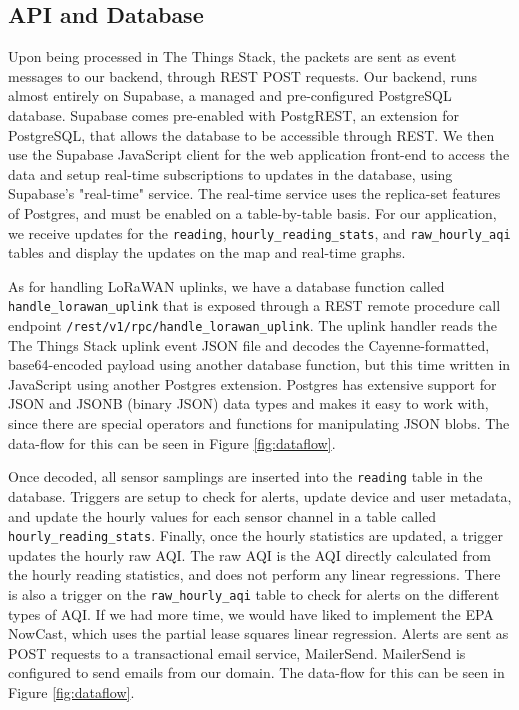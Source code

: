 \documentclass[conference]{IEEEtran}
\newcommand*{\lorawan}{LoRaWAN\xspace}
\begin{document}
\subsection{API and Database}
Upon being processed in The Things Stack, the packets are sent as event messages to our backend, through REST POST requests. Our backend, runs almost entirely on Supabase, a managed and pre-configured PostgreSQL database. Supabase comes pre-enabled with PostgREST, an extension for PostgreSQL, that allows the database to be accessible through REST. We then use the Supabase JavaScript client for the web application front-end to access the data and setup real-time subscriptions to updates in the database, using Supabase's "real-time" service. The real-time service uses the replica-set features of Postgres, and must be enabled on a table-by-table basis. For our application, we receive updates for the \texttt{reading}, \texttt{hourly\_reading\_stats}, and \texttt{raw\_hourly\_aqi} tables and display the updates on the map and real-time graphs.

As for handling \lorawan uplinks, we have a database function called \texttt{handle\_lorawan\_uplink} that is exposed through a REST remote procedure call endpoint \texttt{/rest/v1/rpc/handle\_lorawan\_uplink}. The uplink handler reads the The Things Stack uplink event JSON file and decodes the Cayenne-formatted, base64-encoded payload using another database function, but this time written in JavaScript using another Postgres extension. Postgres has extensive support for JSON and JSONB (binary JSON) data types and makes it easy to work with, since there are special operators and functions for manipulating JSON blobs. The data-flow for this can be seen in Figure \ref{fig:dataflow}.

Once decoded, all sensor samplings are inserted into the \texttt{reading} table in the database. Triggers are setup to check for alerts, update device and user metadata, and update the hourly values for each sensor channel in a table called \texttt{hourly\_reading\_stats}. Finally, once the hourly statistics are updated, a trigger updates the hourly raw AQI. The raw AQI is the AQI directly calculated from the hourly reading statistics, and does not perform any linear regressions. There is also a trigger on the \texttt{raw\_hourly\_aqi} table to check for alerts on the different types of AQI. If we had more time, we would have liked to implement the EPA NowCast, which uses the partial lease squares linear regression. Alerts are sent as POST requests to a transactional email service, MailerSend. MailerSend is configured to send emails from our domain. The data-flow for this can be seen in Figure \ref{fig:dataflow}.
\end{document}
